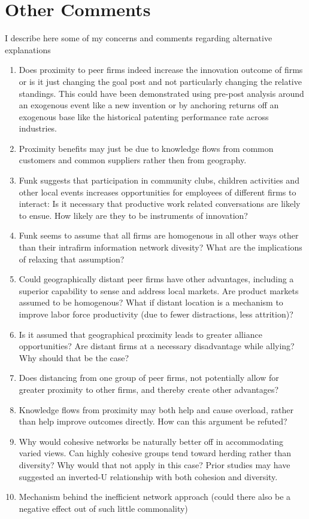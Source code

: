 \documentclass[12pt,letterpaper]{article}
\begin{document}
\section{Other Comments}
I describe here some of my concerns and comments regarding alternative explanations
\begin{enumerate}
  \item Does proximity to peer firms indeed increase the innovation outcome of firms or is it just changing the goal post and not particularly changing the relative standings. This could have been demonstrated using pre-post analysis around an exogenous event like a new invention or by anchoring returns off an exogenous base like the historical patenting performance rate across industries.
  \item Proximity benefits may just be due to knowledge flows from common customers and common suppliers rather then from geography.
  \item Funk suggests that participation in community clubs, children activities and other local events increases opportunities for employees of different firms to interact: Is it necessary that productive work related conversations are likely to ensue. How likely are they to be instruments of innovation?
  \item Funk seems to assume that all firms are  homogenous in all other ways other than their intrafirm information network divesity? What are the implications of relaxing that assumption?
  \item Could geographically distant peer firms have other advantages, including a superior capability to sense and address local markets. Are product markets assumed to be homogenous? What if distant location is a mechanism to improve labor force productivity (due to fewer distractions, less attrition)?
  \item Is it assumed that geographical proximity leads to greater alliance opportunities? Are distant firms at a necessary disadvantage while allying? Why should that be the case?
  \item Does distancing from one group of peer firms, not potentially allow for greater proximity to other firms, and thereby create other advantages?
  \item Knowledge flows from proximity may both help and cause overload, rather than help improve outcomes directly. How can this argument be refuted?
  \item Why would cohesive networks be naturally better off in accommodating varied views. Can highly cohesive groups tend toward herding rather than diversity? Why would that not apply in this case? Prior studies may have suggested an inverted-U relationship with both cohesion and diversity.
  \item Mechanism behind the inefficient network approach (could there also be a negative effect out of such little commonality) \end{enumerate}

\begin{singlespace}
\renewcommand{\refname}{REFERENCES}
 

\end{singlespace}
\end{document}
